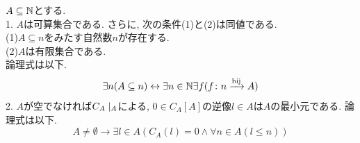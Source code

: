 \begin{corollary}[p186の系7.1.6]
	$A \subseteq \mathbb{N}$とする.\\
  1. $A$は可算集合である. 
  さらに,
  次の条件(1)と(2)は同値である.\\
  (1)$A \subseteq n$をみたす自然数$n$が存在する.\\
  (2)$A$は有限集合である.\\
  論理式は以下.
  \begin{equation*}
     \exists n (A \subseteq n) \leftrightarrow
     \exists n \in \mathbb{N} \exists f (f\colon n \xrightarrow{\text{bij}} A)
  \end{equation*}
  2. $A$が空でなければ$C_A\mid_{A}$による,
  $0 \in C_A[A]$の逆像$l \in A$は$A$の最小元である.
  論理式は以下.
  \begin{equation*}
     A \neq \emptyset \rightarrow
     \exists l \in A(C_A(l) = 0 \land \forall n \in A(l \leq n))
  \end{equation*}
\end{corollary}

